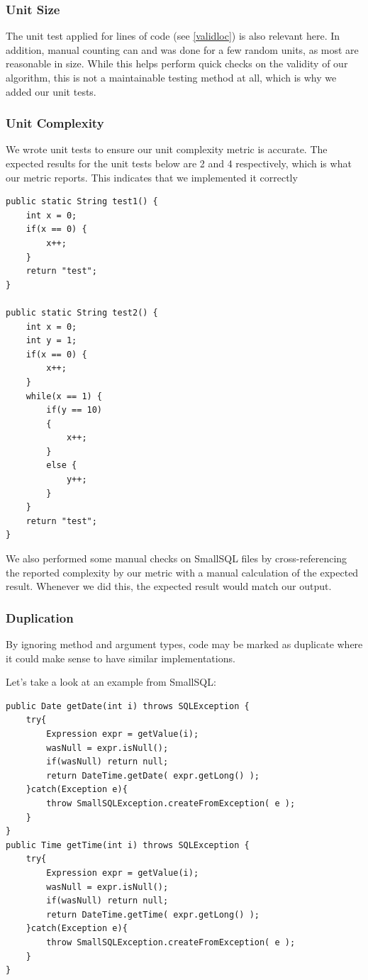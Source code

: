 \documentclass{article}
\begin{document}
\subsubsection{Unit Size} \label{validunitsize}
The unit test applied for lines of code (see \ref{validloc}) is also relevant here. In addition, manual counting can and was done for a few random units, as most are reasonable in size. While this helps perform quick checks on the validity of our algorithm, this is not a maintainable testing method at all, which is why we added our unit tests.

\subsubsection{Unit Complexity}
We wrote unit tests to ensure our unit complexity metric is accurate. The expected results for the unit tests below are 2 and 4 respectively, which is what our metric reports. This indicates that we implemented it correctly

\begin{lstlisting}
public static String test1() {
	int x = 0;
	if(x == 0) {
		x++;
	}
	return "test";
}

public static String test2() {
	int x = 0;
	int y = 1;
	if(x == 0) {
		x++;
	}
	while(x == 1) {
		if(y == 10)
		{
			x++;
		}
		else {
			y++;
		}
	}
	return "test";
}
\end{lstlisting}

We also performed some manual checks on SmallSQL files by cross-referencing the reported complexity by our metric with a manual calculation of the expected result. Whenever we did this, the expected result would match our output.

\subsubsection{Duplication}
By ignoring method and argument types, code may be marked as duplicate where it could make sense to have similar implementations.

Let's take a look at an example from SmallSQL:

\begin{lstlisting}
public Date getDate(int i) throws SQLException {
    try{
		Expression expr = getValue(i);
        wasNull = expr.isNull();
		if(wasNull) return null;
		return DateTime.getDate( expr.getLong() );
    }catch(Exception e){
        throw SmallSQLException.createFromException( e );
    }
}
public Time getTime(int i) throws SQLException {
    try{
		Expression expr = getValue(i);
        wasNull = expr.isNull();
		if(wasNull) return null;
		return DateTime.getTime( expr.getLong() );
    }catch(Exception e){
        throw SmallSQLException.createFromException( e );
    }
}
\end{lstlisting}
\end{document}
